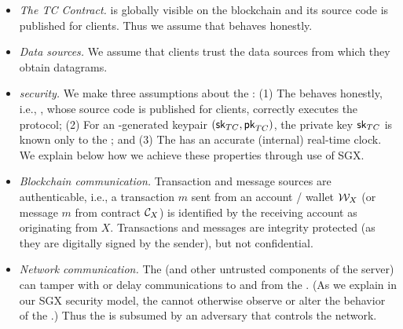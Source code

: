 \begin{itemize}
  \setlength{\itemsep}{2pt}
  \setlength{\parskip}{0pt}
  \setlength{\parsep}{0pt}

\item {\em The TC Contract.} \tcont is globally visible on the blockchain and its source code is published for clients. Thus we assume that \tcont behaves honestly.

\item {\em Data sources.} We assume that clients trust the data sources from which they obtain \tc datagrams.

\item {\em \encname security.} We make three assumptions about the \encname : (1) The \encname behaves honestly, i.e., \engine, whose source code is published for clients, correctly executes the \tc protocol; (2) For an \encname-generated keypair $({\sf sk}_{TC}, {\sf pk}_{TC})$, the private key ${\sf sk}_{TC}$ is known only to the \encname; and (3) The \encname has an accurate (internal) real-time clock. We explain below how we achieve these properties through use of SGX. 


\item {\em Blockchain communication.} Transaction and message sources are authenticable, i.e., a transaction $m$ sent from an account / wallet ${\cal W}_{X}$ (or message $m$ from contract ${\cal C}_{X}$) is identified by the receiving account as originating from $X$. Transactions and messages are integrity protected (as they are digitally signed by the sender), but not confidential. 

\item {\em Network communication.} The \medname (and other untrusted components of the \tc server) can tamper with or delay communications to and from the \encname. (As we explain in our SGX security model, the \medname cannot otherwise observe or alter the behavior of the \encname.) Thus the \medname is subsumed by an adversary that controls the network. 

\end{itemize}












